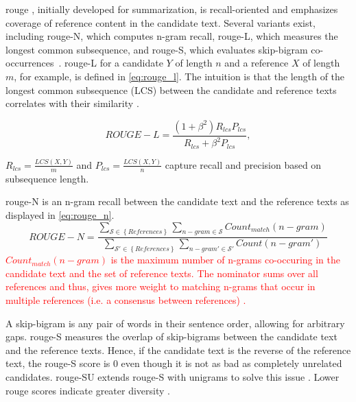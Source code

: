 \ac{rouge} \citep{lin_rouge_2004}, initially developed for summarization, is recall-oriented and emphasizes coverage of reference content in the candidate text. 
Several variants exist, including \ac{rouge}-N, which computes n-gram recall, \ac{rouge}-L, which measures the longest common subsequence, and \ac{rouge}-S, which evaluates skip-bigram co-occurrences~\citep{zhou_paraphrase_2021,palivela_optimization_2021,kurt_pehlivanoglu_comparative_2024}. 
\ac{rouge}-L for a candidate $Y$ of length $n$ and a reference $X$ of length $m$, for example, is defined in \autoref{eq:rouge_l}.
The intuition is that the length of the longest common subsequence (LCS) between the candidate and reference texts correlates with their similarity \citep{lin_rouge_2004}.

\begin{equation}
ROUGE-L = \frac{(1 + \beta^2)R_{lcs}P_{lcs}}{R_{lcs} + \beta^2 P_{lcs}},
\label{eq:rouge_l}
\end{equation}

$R_{lcs} = \frac{LCS(X,Y)}{m}$ and $P_{lcs} = \frac{LCS(X,Y)}{n}$ capture recall and precision based on subsequence length. 

\ac{rouge}-N is an n-gram recall between the candidate text and the reference texts \citep{lin_rouge_2004} as displayed in \autoref{eq:rouge_n}.
\begin{equation}
    ROUGE-N = \frac{\sum_{\mathcal{S} \in \left\{ References \right\}}\sum_{n-gram \in\mathcal{S}}Count_{match}(n-gram)}{\sum_{\mathcal{S'} \in \left\{ References \right\}}\sum_{n-gram' \in\mathcal{S'}}Count(n-gram')}
\label{eq:rouge_n}
\end{equation}
\textcolor{red}{$Count_{match}(n-gram)$ is the maximum number of n-grams co-occuring in the candidate text and the set of reference texts.
The nominator sums over all references and thus, gives more weight to matching n-grams that occur in multiple references (i.e. a consensus between references) \citep{lin_rouge_2004}.}

A skip-bigram is any pair of words in their sentence order, allowing for arbitrary gaps.
\ac{rouge}-S measures the overlap of skip-bigrams between the candidate text and the reference texts.
Hence, if the candidate text is the reverse of the reference text, the \ac{rouge}-S score is 0 even though it is not as bad as completely unrelated candidates.
\ac{rouge}-SU extends \ac{rouge}-S with unigrams to solve this issue \citep{lin_rouge_2004}.
Lower \ac{rouge} scores indicate greater diversity \citep{kurt_pehlivanoglu_comparative_2024}.

